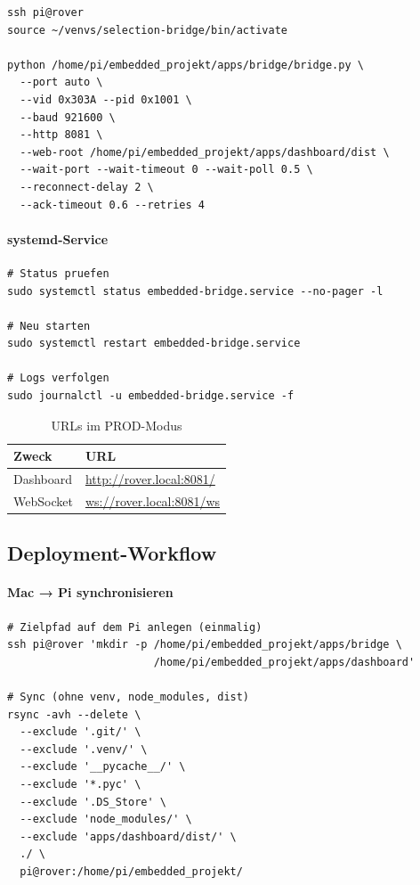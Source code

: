 \begin{lstlisting}[style=shell, caption={Bridge manuell starten}, label={lst:bridge-start}]
ssh pi@rover
source ~/venvs/selection-bridge/bin/activate

python /home/pi/embedded_projekt/apps/bridge/bridge.py \
  --port auto \
  --vid 0x303A --pid 0x1001 \
  --baud 921600 \
  --http 8081 \
  --web-root /home/pi/embedded_projekt/apps/dashboard/dist \
  --wait-port --wait-timeout 0 --wait-poll 0.5 \
  --reconnect-delay 2 \
  --ack-timeout 0.6 --retries 4
\end{lstlisting}

\paragraph{systemd-Service}

\begin{lstlisting}[style=shell, caption={systemd-Befehle}, label={lst:systemd}]
# Status pruefen
sudo systemctl status embedded-bridge.service --no-pager -l

# Neu starten
sudo systemctl restart embedded-bridge.service

# Logs verfolgen
sudo journalctl -u embedded-bridge.service -f
\end{lstlisting}

\begin{table}[H]
\centering
\caption{URLs im PROD-Modus}
\label{tab:urls}
\begin{tabularx}{\textwidth}{@{}l X@{}}
\toprule
\textbf{Zweck} & \textbf{URL} \\
\midrule
Dashboard & \url{http://rover.local:8081/} \\
WebSocket & \url{ws://rover.local:8081/ws} \\
\bottomrule
\end{tabularx}
\end{table}

\subsection{Deployment-Workflow}
\label{subsec:deployment}

\paragraph{Mac → Pi synchronisieren}

\begin{lstlisting}[style=shell, caption={rsync-Synchronisation}, label={lst:rsync}]
# Zielpfad auf dem Pi anlegen (einmalig)
ssh pi@rover 'mkdir -p /home/pi/embedded_projekt/apps/bridge \
                       /home/pi/embedded_projekt/apps/dashboard'

# Sync (ohne venv, node_modules, dist)
rsync -avh --delete \
  --exclude '.git/' \
  --exclude '.venv/' \
  --exclude '__pycache__/' \
  --exclude '*.pyc' \
  --exclude '.DS_Store' \
  --exclude 'node_modules/' \
  --exclude 'apps/dashboard/dist/' \
  ./ \
  pi@rover:/home/pi/embedded_projekt/
\end{lstlisting}

